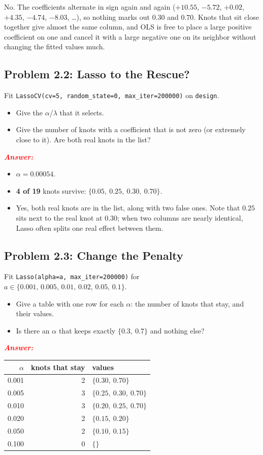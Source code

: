 \documentclass[11pt, letterpaper]{article}
\newcommand{\subproblem}[1]{\subsection*{Problem #1}}
\newcommand{\answer}{\textbf{\textit{\textcolor{red}{Answer:}}}}
\begin{document}
No. The coefficients alternate in sign again and again
($+10.55$, $-5.72$, $+0.02$, $+4.35$, $-4.74$, $-8.03$, \dots), so nothing marks out $0.30$
and $0.70$.
Knots that sit close together give almost the same column, and OLS is free to place a large positive
coefficient on one and cancel it with a large negative one on its neighbor without changing the
fitted values much.


\subproblem{2.2: Lasso to the Rescue?}
Fit \texttt{LassoCV(cv=5, random\_state=0, max\_iter=200000)} on \texttt{design}.
\begin{itemize}
    \item Give the $\alpha$/$\lambda$ that it selects.
    \item Give the number of knots with a coefficient that is not zero (or extremely close to it). Are both real knots in the list?
\end{itemize}

\answer

\begin{itemize}
    \item $\alpha = \mathbf{0.00054}$.
    \item \textbf{4 of 19} knots survive: $\{0.05,\ 0.25,\ 0.30,\ 0.70\}$.
    \item Yes, both real knots are in the list, along with two false ones. Note that $0.25$ sits next
          to the real knot at $0.30$; when two columns are nearly identical, Lasso often splits one
          real effect between them.
\end{itemize}


\subproblem{2.3: Change the Penalty}
Fit \texttt{Lasso(alpha=a, max\_iter=200000)} for
$a \in \{0.001,\, 0.005,\, 0.01,\, 0.02,\, 0.05,\, 0.1\}$.
\begin{itemize}
    \item Give a table with one row for each $\alpha$: the number of knots that stay, and their values.
    \item Is there an $\alpha$ that keeps exactly $\{0.3,\ 0.7\}$ and nothing else?
\end{itemize}

\answer

\begin{center}
\begin{tabular}{rrl}
\toprule
$\alpha$ & knots that stay & values \\
\midrule
0.001 & 2 & $\{0.30,\ 0.70\}$ \\
0.005 & 3 & $\{0.25,\ 0.30,\ 0.70\}$ \\
0.010 & 3 & $\{0.20,\ 0.25,\ 0.70\}$ \\
0.020 & 2 & $\{0.15,\ 0.20\}$ \\
0.050 & 2 & $\{0.10,\ 0.15\}$ \\
0.100 & 0 & $\{\}$ \\
\bottomrule
\end{tabular}
\end{center}
\end{document}
